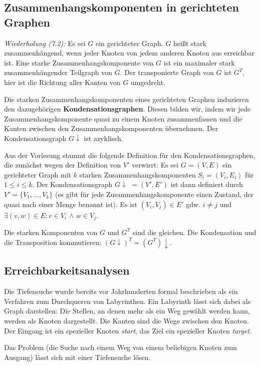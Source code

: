 \documentclass[12pt]{article}
\begin{document}
\subsection{Zusammenhangskomponenten in gerichteten Graphen}

\textit{Wiederholung (7.2):} Es sei $G$ ein gerichteter Graph. $G$ heißt stark zusammenhängend, wenn jeder Knoten von jedem anderen Knoten aus erreichbar ist. Eine starke Zusammenhangskomponente von $G$ ist ein maximaler stark zusammenhängender Teilgraph von $G$. Der transponierte Graph von $G$ ist $G^T$, hier ist die Richtung aller Kanten von $G$ umgedreht.

Die starken Zusammenhangskomponenten eines gerichteten Graphen induzieren den dazugehörigen \textbf{Kondensationsgraphen}. Diesen bilden wir, indem wir jede Zusammenhangskomponente quasi zu einem Knoten zusammenfassen und die Kanten zwischen den Zusammenhangskomponenten übernehmen. Der Kondensationsgraph $G\downarrow$ ist azyklisch.

Aus der Vorlesung stammt die folgende Definition für den Kondensationsgraphen, die zunächst wegen der Definition von $V'$ verwirrt: Es sei $G = (V, E)$ ein gerichteter Graph mit $k$ starken Zusammenhangskomponenten $S_i = (V_i, E_i)$ für $1 \leq i \leq k$. Der Kondensationsgraph $G\downarrow$ $= (V', E')$ ist dann definiert durch $V' = \{V_1, ..., V_k\}$ (es gibt für jede Zusammenhangskomponente einen Zustand, der quasi nach einer Menge benannt ist). Es ist $(V_i, V_j) \in E'$ gdw. $i \neq j$ und $\exists(v, w) \in E : v \in V_i$ $\land$ $w \in V_j$.

Die starken Komponenten von $G$ und $G^T$ sind die gleichen. Die Kondensation und die Transposition kommutieren: $(G\downarrow)^T = (G^T)\downarrow$.

\subsection{Erreichbarkeitsanalysen}

Die Tiefensuche wurde bereits vor Jahrhunderten formal beschrieben als ein Verfahren zum Durchqueren von Labyrinthen. Ein Labyrinth lässt sich dabei als Graph darstellen: Die Stellen, an denen mehr als ein Weg gewählt werden kann, werden als Knoten dargestellt. Die Kanten sind die Wege zwischen den Knoten. Der Eingang ist ein spezieller Knoten \textit{start}, das Ziel ein spezieller Knoten \textit{target}.

Das Problem (die Suche nach einem Weg von einem beliebigen Knoten zum Ausgang) lässt sich mit einer Tiefensuche lösen.
\end{document}
